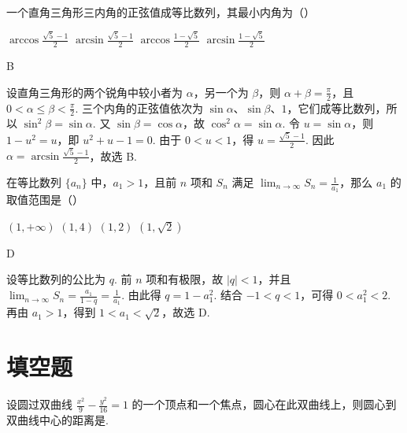 \documentclass[UTF8,a4paper,oneside,11pt]{ctexbook}
\begin{document}
\begin{problem}
一个直角三角形三内角的正弦值成等比数列，其最小内角为（\quad）

\choices
    {\(\arccos \frac{\sqrt{5} - 1}{2}\)}
    {\(\arcsin \frac{\sqrt{5} - 1}{2}\)}
    {\(\arccos \frac{1 - \sqrt{5}}{2}\)}
    {\(\arcsin \frac{1 - \sqrt{5}}{2}\)}
\end{problem}

\begin{answer}
B
\end{answer}

\begin{solution}
设直角三角形的两个锐角中较小者为 \(\alpha\)，另一个为 \(\beta\)，则 \(\alpha+\beta=\frac{\pi}{2}\)，且
\(0<\alpha\leq\beta<\frac{\pi}{2}\). 三个内角的正弦值依次为 \(\sin\alpha\)、\(\sin\beta\)、\(1\)，它们成等比数列，所以
\(\sin^{2}\beta=\sin\alpha\). 又 \(\sin\beta=\cos\alpha\)，故 \(\cos^{2}\alpha=\sin\alpha\). 令 \(u=\sin\alpha\)，则
\(1-u^{2}=u\)，即 \(u^{2}+u-1=0\). 由于 \(0<u<1\)，得 \(u=\frac{\sqrt{5}-1}{2}\). 因此
\(\alpha=\arcsin\frac{\sqrt{5}-1}{2}\)，故选 B.
\end{solution}

\begin{problem}
在等比数列 \(\{a_{n}\}\) 中，\(a_{1}>1\)，且前 \(n\) 项和 \(S_{n}\) 满足 \(\displaystyle\lim_{n\to\infty} S_{n}=\frac{1}{a_{1}}\)，那么 \(a_{1}\) 的取值范围是（\quad）

\choices
    {\((1, +\infty)\)}
    {\((1,4)\)}
    {\((1,2)\)}
    {\((1,\sqrt{2})\)}
\end{problem}

\begin{answer}
D
\end{answer}

\begin{solution}
设等比数列的公比为 \(q\). 前 \(n\) 项和有极限，故 \(|q|<1\)，并且
\(\lim_{n\to\infty}S_{n}=\frac{a_{1}}{1-q}=\frac{1}{a_{1}}\). 由此得
\(q=1-a_{1}^{2}\). 结合 \(-1<q<1\)，可得 \(0<a_{1}^{2}<2\). 再由 \(a_{1}>1\)，得到
\(1<a_{1}<\sqrt{2}\)，故选 D.
\end{solution}

\section{填空题}

\begin{problem}
设圆过双曲线 \(\frac{x^{2}}{9} - \frac{y^{2}}{16} = 1\) 的一个顶点和一个焦点，圆心在此双曲线上，则圆心到双曲线中心的距离是\fillinblank{}.
\end{problem}
\end{document}
